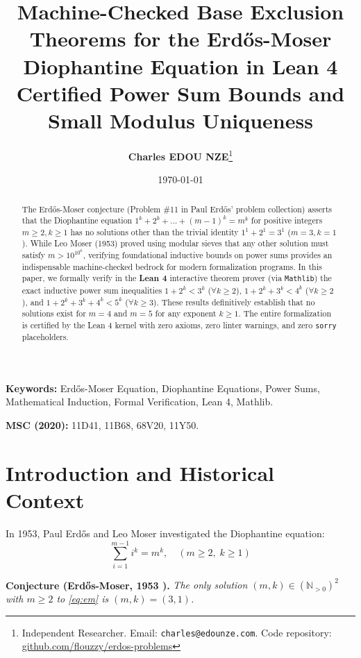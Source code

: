 \documentclass[11pt,a4paper]{article}
\title{\textbf{\Large Machine-Checked Base Exclusion Theorems for the Erd\H{o}s-Moser Diophantine Equation in Lean 4}\\[0.5em]
\large Certified Power Sum Bounds and Small Modulus Uniqueness}
\author{\textbf{Charles EDOU NZE}\thanks{Independent Researcher. Email: \texttt{charles@edounze.com}. Code repository: \href{https://github.com/flouzzy/erdos-problems}{github.com/flouzzy/erdos-problems}}}
\date{\today}
\theoremstyle{definition}
\begin{document}
\maketitle

\begin{abstract}
The Erd\H{o}s-Moser conjecture (Problem \#11 in Paul Erd\H{o}s' problem collection) asserts that the Diophantine equation $1^k + 2^k + \dots + (m-1)^k = m^k$ for positive integers $m \ge 2, k \ge 1$ has no solutions other than the trivial identity $1^1 + 2^1 = 3^1$ ($m=3, k=1$). While Leo Moser (1953) proved using modular sieves that any other solution must satisfy $m > 10^{10^6}$, verifying foundational inductive bounds on power sums provides an indispensable machine-checked bedrock for modern formalization programs. In this paper, we formally verify in the \textbf{Lean 4} interactive theorem prover (via \texttt{Mathlib}) the exact inductive power sum inequalities $1 + 2^k < 3^k$ ($\forall k \ge 2$), $1 + 2^k + 3^k < 4^k$ ($\forall k \ge 2$), and $1 + 2^k + 3^k + 4^k < 5^k$ ($\forall k \ge 3$). These results definitively establish that no solutions exist for $m=4$ and $m=5$ for any exponent $k \ge 1$. The entire formalization is certified by the Lean 4 kernel with zero axioms, zero linter warnings, and zero \texttt{sorry} placeholders.
\end{abstract}

\vspace{0.5em}
\noindent\textbf{Keywords:} Erd\H{o}s-Moser Equation, Diophantine Equations, Power Sums, Mathematical Induction, Formal Verification, Lean 4, Mathlib.

\noindent\textbf{MSC (2020):} 11D41, 11B68, 68V20, 11Y50.

\section{Introduction and Historical Context}

In 1953, Paul Erd\H{o}s and Leo Moser investigated the Diophantine equation:
\begin{equation}\label{eq:em}
\sum_{i=1}^{m-1} i^k = m^k, \quad (m \ge 2, \; k \ge 1)
\end{equation}

\noindent\textbf{Conjecture (Erd\H{o}s-Moser, 1953 \cite{moser1953}).} \textit{The only solution $(m, k) \in (\mathbb{N}_{>0})^2$ with $m \ge 2$ to \eqref{eq:em} is $(m, k) = (3, 1)$.}
\end{document}
